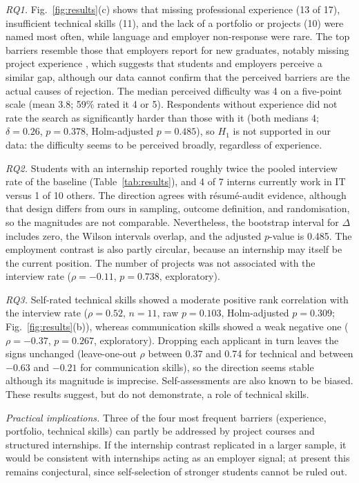 \documentclass[conference]{IEEEtran}
\begin{document}
\textit{RQ1.} Fig.~\ref{fig:results}(c) shows that missing professional experience (13 of 17), insufficient technical skills (11), and the lack of a portfolio or projects (10) were named most often, while language and employer non-response were rare. The top barriers resemble those that employers report for new graduates, notably missing project experience \cite{radermacher2014}, which suggests that students and employers perceive a similar gap, although our data cannot confirm that the perceived barriers are the actual causes of rejection. The median perceived difficulty was 4 on a five-point scale (mean 3.8; 59\% rated it 4 or 5). Respondents without experience did not rate the search as significantly harder than those with it (both medians 4; $\delta=0.26$, $p=0.378$, Holm-adjusted $p=0.485$), so $H_1$ is not supported in our data: the difficulty seems to be perceived broadly, regardless of experience.

\textit{RQ2.} Students with an internship reported roughly twice the pooled interview rate of the baseline (Table~\ref{tab:results}), and 4 of 7 interns currently work in IT versus 1 of 10 others. The direction agrees with résumé-audit evidence, although that design differs from ours in sampling, outcome definition, and randomisation, so the magnitudes are not comparable. Nevertheless, the bootstrap interval for $\Delta$ includes zero, the Wilson intervals overlap, and the adjusted $p$-value is 0.485. The employment contrast is also partly circular, because an internship may itself be the current position. The number of projects was not associated with the interview rate ($\rho=-0.11$, $p=0.738$, exploratory).

\textit{RQ3.} Self-rated technical skills showed a moderate positive rank correlation with the interview rate ($\rho=0.52$, $n=11$, raw $p=0.103$, Holm-adjusted $p=0.309$; Fig.~\ref{fig:results}(b)), whereas communication skills showed a weak negative one ($\rho=-0.37$, $p=0.267$, exploratory). Dropping each applicant in turn leaves the signs unchanged (leave-one-out $\rho$ between 0.37 and 0.74 for technical and between $-0.63$ and $-0.21$ for communication skills), so the direction seems stable although its magnitude is imprecise. Self-assessments are also known to be biased. These results suggest, but do not demonstrate, a role of technical skills.

\textit{Practical implications.} Three of the four most frequent barriers (experience, portfolio, technical skills) can partly be addressed by project courses and structured internships. If the internship contrast replicated in a larger sample, it would be consistent with internships acting as an employer signal; at present this remains conjectural, since self-selection of stronger students cannot be ruled out.
\end{document}
